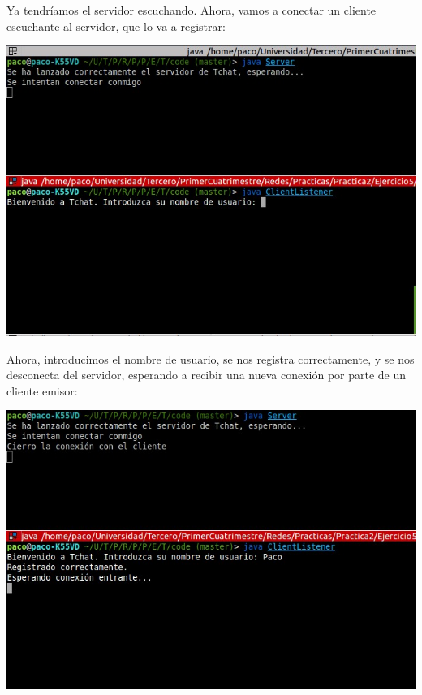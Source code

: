 \documentclass[12pt]{article}       %
\begin{document}
Ya tendríamos el servidor escuchando. Ahora, vamos a conectar un cliente escuchante al servidor, que lo va a registrar:\\
\begin{center}
\includegraphics[scale=0.7]{images/Selection_002}
\end{center}

Ahora, introducimos el nombre de usuario, se nos registra correctamente, y se nos desconecta del servidor, esperando a recibir una nueva conexión por parte de un cliente emisor:\\
\begin{center}
\includegraphics[scale=0.5]{images/Selection_003}
\end{center}
\end{document}
